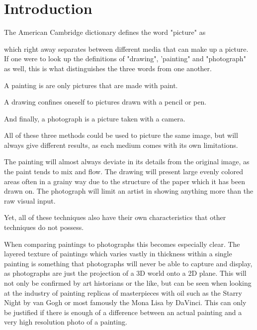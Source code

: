 \chapter{Introduction}



The American Cambridge dictionary defines the word "picture" as
    
 
which right away separates between different media that can make up a picture.
If one were to look up the definitions of "drawing", 'painting" and "photograph"
as well, this is what distinguishes the three words from one another.

A painting is are only pictures that are made with paint.

A drawing confines oneself to pictures drawn with a pencil or pen.

And finally, a photograph is a picture taken with a camera.

All of these three methods could be used to picture the same image, but will always
give different results, as each medium comes with its own limitations.

The painting will almost always deviate in its details from the original image, as
the paint tends to mix and flow.
The drawing will present large evenly colored areas often in a grainy way due to the
structure of the paper which it has been drawn on.
The photograph will limit an artist in showing anything more than the raw visual input.

Yet, all of these techniques also have their own characteristics that other techniques
do not possess.

When comparing paintings to photographs this becomes especially clear.
The layered texture of paintings which varies vastly in thickness within a single
painting is something that photographs will never be able to capture and display,
as photographs are just the projection of a 3D world onto a 2D plane.
This will not only be confirmed by art historians or the like, but can be seen when
looking at the industry of painting replicas of masterpieces with oil such as the Starry Night
by van Gogh or most famously the Mona Lisa by DaVinci.
This can only be justified if there is enough of a difference between an actual
painting and a very high resolution photo of a painting.

